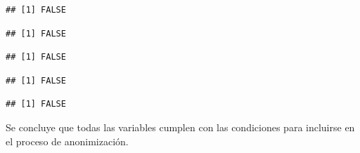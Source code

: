 \documentclass[]{book}
\newenvironment{Shaded}{\begin{snugshade}}{\end{snugshade}}
\newcommand{\DecValTok}[1]{\textcolor[rgb]{0.00,0.00,0.81}{#1}}
\newcommand{\KeywordTok}[1]{\textcolor[rgb]{0.13,0.29,0.53}{\textbf{#1}}}
\newcommand{\NormalTok}[1]{#1}
\newcommand{\OperatorTok}[1]{\textcolor[rgb]{0.81,0.36,0.00}{\textbf{#1}}}
\newcommand{\StringTok}[1]{\textcolor[rgb]{0.31,0.60,0.02}{#1}}
\theoremstyle{definition}
\theoremstyle{definition}
\theoremstyle{definition}
\theoremstyle{definition}
\theoremstyle{remark}
\begin{document}
\begin{verbatim}
## [1] FALSE
\end{verbatim}

\begin{Shaded}
\end{Shaded}

\begin{verbatim}
## [1] FALSE
\end{verbatim}

\begin{Shaded}
\end{Shaded}

\begin{verbatim}
## [1] FALSE
\end{verbatim}

\begin{Shaded}
\end{Shaded}

\begin{verbatim}
## [1] FALSE
\end{verbatim}

\begin{Shaded}
\end{Shaded}

\begin{verbatim}
## [1] FALSE
\end{verbatim}

Se concluye que todas las variables cumplen con las condiciones para incluirse en el proceso de anonimización.
\end{document}
